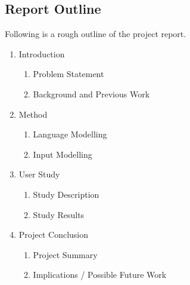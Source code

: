 \documentclass[a4paper, titlepage, 12pt, draft]{article}
\renewcommand{\%}{\scalebox{.9}{\oldpct}}
\begin{document}
\subsection*{Report Outline}
Following is a rough outline of the project report.
\begin{enumerate}
	\item Introduction
	\begin{enumerate}
		\item Problem Statement
		\item Background and Previous Work
	\end{enumerate}
	\item Method
	\begin{enumerate}
		\item Language Modelling
		\item Input Modelling
	\end{enumerate}
	\item User Study
	\begin{enumerate}
		\item Study Description
		\item Study Results
	\end{enumerate}
	\item Project Conclusion
	\begin{enumerate}
		\item Project Summary
		\item Implications / Possible Future Work
	\end{enumerate}
\end{enumerate}
\end{document}
